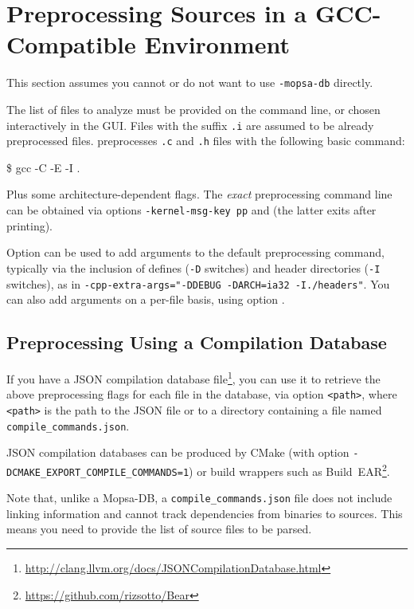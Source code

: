 \section{Preprocessing Sources in a GCC-Compatible Environment}
\label{sec:preprocessing-gcc}

This section assumes you cannot or do not want to use \texttt{-mopsa-db}
directly.

The list of files to analyze must be provided on the command line, or
chosen interactively in the GUI. Files with the suffix
{\tt .i} are assumed to be already preprocessed \C files. \FramaC
preprocesses {\tt .c} and {\tt .h} files with the following basic command:
\begin{shell}
\$ gcc -C -E -I .
\end{shell}
Plus some architecture-dependent flags. The {\em exact} preprocessing command
line can be obtained via options \texttt{-kernel-msg-key pp} and
 (the latter exits \FramaC after printing).

Option  can be used to add arguments to the
default preprocessing command, typically via the inclusion of defines
(\texttt{-D} switches) and header directories (\texttt{-I} switches), as in
\texttt{-cpp-extra-args="-DDEBUG -DARCH=ia32 -I./headers"}.
You can also add arguments on a per-file basis, using option
.

\subsection{Preprocessing Using a Compilation Database}\label{sec:compilation-db}

If you have a JSON compilation database file\footnote{%
  \url{http://clang.llvm.org/docs/JSONCompilationDatabase.html}}, you can use
it to retrieve the above preprocessing flags for each file in the database,
via option  \texttt{<path>},
where \texttt{<path>} is the path to the JSON file or to a directory containing
a file named \texttt{compile\_commands.json}.

JSON compilation databases can be produced by \textsf{CMake} (with option
\verb|-DCMAKE_EXPORT_COMPILE_COMMANDS=1|) or build wrappers such as
Build~EAR\footnote{\url{https://github.com/rizsotto/Bear}}.

Note that, unlike a Mopsa-DB, a \verb|compile_commands.json| file does not
include linking information and cannot track dependencies from binaries to
sources. This means you need to provide the list of source files to be parsed.

